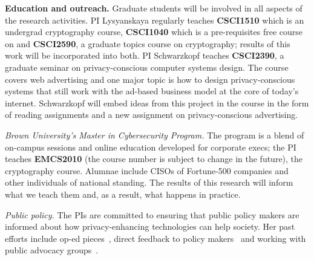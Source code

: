 \noindent\textbf{Education and outreach.} Graduate students will be involved in all aspects of the research activities.  PI Lysyanskaya
regularly teaches \textbf{CSCI1510} which is an undergrad cryptography course, \textbf{CSCI1040} which is a pre-requisites free course on  and \textbf{CSCI2590}, a graduate topics course on cryptography; results of this work will be incorporated into both.
%
PI Schwarzkopf teaches \textbf{CSCI2390}, a graduate seminar on privacy-conscious computer systems design. The course covers web advertising and one major topic is how to design privacy-conscious systems that still work with the ad-based business model at the core of today's internet. Schwarzkopf will embed ideas from this project in the course in the form of reading assignments and a new assignment on privacy-conscious advertising.
%

\noindent\textit{Brown University's Master in Cybersecurity Program.} The program is a blend of on-campus sessions and online education developed for corporate execs; the PI teaches \textbf{EMCS2010} (the course number is subject to change in the future), the cryptography course.  Alumnae include CISOs of Fortune-500 companies and other individuals of national standing.  
The results of this research will inform what we teach them and, as a result, what happens in practice.

\noindent\textit{Public policy.} The PIs are committed to ensuring that public policy makers are informed about how privacy-enhancing technologies can help society.  Her past efforts include op-ed pieces~\cite{projo1,csm,projo2}, direct feedback to policy makers~\cite{annacdt} and working with public advocacy groups~\cite{epic15}.  

